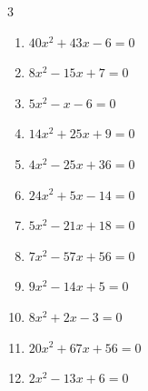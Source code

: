 \begin{multicols}{3}
\begin{enumerate}

  \item $40x^{2}+43x-6=0$


  \item $8x^{2}-15x+7=0$


  \item $5x^{2}-x-6=0$


\columnbreak %

  \item $14x^{2}+25x+9=0$


  \item $4x^{2}-25x+36=0$


  \item $24x^{2}+5x-14=0$


  \item $5x^{2}-21x+18=0$


  \item $7x^{2}-57x+56=0$


  \item $9x^{2}-14x+5=0$


  \item $8x^{2}+2x-3=0$


  \item $20x^{2}+67x+56=0$


  \item $2x^{2}-13x+6=0$



\end{enumerate}
\end{multicols}

